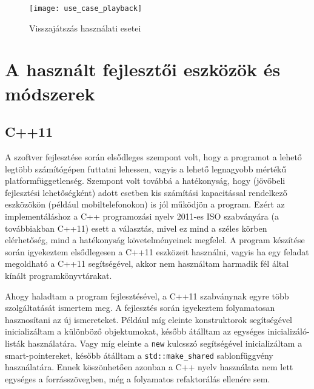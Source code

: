 \documentclass[12pt, twoside]{report}
\begin{document}
\begin{figure}
	\begin{center}
		\texttt{[image: use\_case\_playback]}
	\end{center}
	\caption{Visszajátszás használati esetei}
\end{figure}


\section{A használt fejlesztői eszközök és módszerek}

\subsection{C++11}

A szoftver fejlesztése során elsődleges szempont volt, hogy a programot a lehető legtöbb számítógépen futtatni lehessen, vagyis a lehető legnagyobb mértékű platformfüggetlenség. Szempont volt továbbá a hatékonyság, hogy (jövőbeli fejlesztési lehetőségként) adott esetben kis számítási kapacitással rendelkező eszközökön (például mobiltelefonokon) is jól működjön a program. Ezért az implementáláshoz a C++ programozási nyelv 2011-es ISO szabványára (a továbbiakban C++11) esett a választás, mivel ez mind a széles körben elérhetőség, mind a hatékonyság követelményeinek megfelel. A program készítése során igyekeztem elsődlegesen a C++11 eszközeit használni, vagyis ha egy feladat megoldható a C++11 segítségével, akkor nem használtam harmadik fél által kínált programkönyvtárakat.

Ahogy haladtam a program fejlesztésével, a C++11 szabványnak egyre több szol\-gál\-ta\-tá\-sát ismertem meg. A fejlesztés során igyekeztem folyamatosan hasznosítani az új ismereteket. Például míg eleinte konstruktorok segítségével inicializáltam a különböző objektumokat, később átálltam az egységes inicializáló-listák használatára. Vagy míg eleinte a \texttt{new} kulcsszó segítségével inicializáltam a smart-pointereket, később átálltam a \texttt{std::make\_shared} sablonfüggvény használatára. Ennek köszönhetően azonban a C++ nyelv használata nem lett egységes a forrásszövegben, még a folyamatos refaktorálás ellenére sem.
\end{document}
